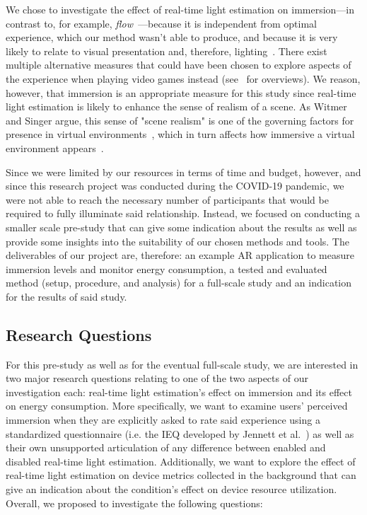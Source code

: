 \documentclass[12pt,twoside,english]{article}
\begin{document}
We chose to investigate the effect of real-time light estimation on immersion---in contrast to, for example, \textit{flow}~\cite{csikszentmihalyi_flow_1990}---because it is independent from optimal experience, which our method wasn't able to produce, and because it is very likely to relate to visual presentation and, therefore, lighting~\cite{jennett_measuring_2008}.
There exist multiple alternative measures that could have been chosen to explore aspects of the experience when playing video games instead (see~\cite{dey_systematic_2018, dunser_survey_2008} for overviews).
We reason, however, that immersion is an appropriate measure for this study since real-time light estimation is likely to enhance the sense of realism of a scene.
As Witmer and Singer argue, this sense of "scene realism" is one of the governing factors for presence in virtual environments~\cite{witmer_measuring_1998}, which in turn affects how immersive a virtual environment appears~\cite{jennett_measuring_2008}.

Since we were limited by our resources in terms of time and budget, however, and since this research project was conducted during the COVID-19 pandemic, we were not able to reach the necessary number of participants that would be required to fully illuminate said relationship.
Instead, we focused on conducting a smaller scale pre-study that can give some indication about the results as well as provide some insights into the suitability of our chosen methods and tools.
The deliverables of our project are, therefore: an example \gls{AR} application to measure immersion levels and monitor energy consumption, a tested and evaluated method (setup, procedure, and analysis) for a full-scale study and an indication for the results of said study.

\subsection{Research Questions}

For this pre-study as well as for the eventual full-scale study, we are interested in two major research questions relating to one of the two aspects of our investigation each: real-time light estimation's effect on immersion and its effect on energy consumption.
More specifically, we want to examine users' perceived immersion when they are explicitly asked to rate said experience using a standardized questionnaire (i.e. the \gls{IEQ} developed by Jennett et al.~\cite{jennett_measuring_2008}) as well as their own unsupported articulation of any difference between enabled and disabled real-time light estimation.
Additionally, we want to explore the effect of real-time light estimation on device metrics collected in the background that can give an indication about the condition's effect on device resource utilization.
Overall, we proposed to investigate the following questions:
\end{document}
